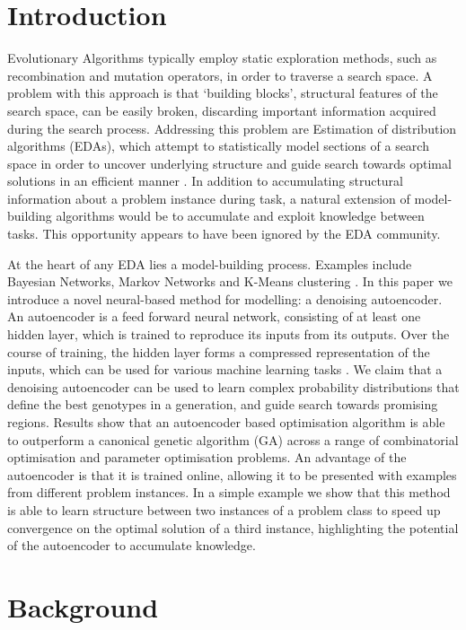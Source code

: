 \documentclass[runningheads,a4paper]{llncs}
\begin{document}
\section{Introduction}
Evolutionary Algorithms typically employ static exploration methods, such as recombination and mutation operators, in order to traverse a search space. A problem with this approach is that `building blocks', structural features of the search space, can be easily broken, discarding important information acquired during the search process. Addressing this problem are Estimation of distribution algorithms (EDAs), which attempt to statistically model sections of a search space in order to uncover underlying structure and guide search towards optimal solutions in an efficient manner \cite{pelikan2006scalable}. In addition to accumulating structural information about a problem instance during task, a natural extension of model-building algorithms would be to accumulate and exploit knowledge between tasks. This opportunity appears to have been ignored by the EDA community.

At the heart of any EDA lies a model-building process. Examples include Bayesian Networks, Markov Networks and K-Means clustering \cite{pelikan2002survey}. In this paper we introduce a novel neural-based method for modelling: a denoising autoencoder. An autoencoder is a feed forward neural network, consisting of at least one hidden layer, which is trained to reproduce its inputs from its outputs. Over the course of training, the hidden layer forms a compressed representation of the inputs, which can be used for various machine learning tasks \cite{hinton2006reducing}. We claim that a denoising autoencoder can be used to learn complex probability distributions that define the best genotypes in a generation, and guide search towards promising regions. Results show that an autoencoder based optimisation algorithm is able to outperform a canonical genetic algorithm (GA) across a range of combinatorial optimisation and parameter optimisation problems. An advantage of the autoencoder is that it is trained online, allowing it to be presented with examples from different problem instances. In a simple example we show that this method is able to learn structure between two instances of a problem class to speed up convergence on the optimal solution of a third instance, highlighting the potential of the autoencoder to accumulate knowledge.

\section{Background}
\end{document}

